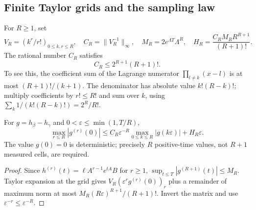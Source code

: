 \subsection{Finite Taylor grids and the sampling law}
For \(R\ge1\), set
\[
 V_R=(k^r/r!)_{0\le k,r\le R},\quad C_R=\|V_R^{-1}\|_\infty,
 \quad M_R=2e^{\Lambda T}\Lambda^R,\quad
 H_R=\frac{C_RM_RR^{R+1}}{(R+1)!}.
\]
The rational number \(C_R\) satisfies
\begin{equation}
 C_R\le2^{R+1}(R+1)!.
 \label{eq:vandermonde-inverse-bound}
\end{equation}
To see this, the coefficient sum of the Lagrange numerator
\(\prod_{l\ne k}(x-l)\) is at most \((R+1)!/(k+1)\).
The denominator has absolute value \(k!(R-k)!\); multiply coefficients by
\(r!\le R!\) and sum over \(k\), using
\(\sum_k1/(k!(R-k)!)=2^R/R!\).

\begin{lemma}
\label{lem:finite-grid-certificate}
For \(g=h_\beta-h_\gamma\) and \(0<\varepsilon\le\min(1,T/R)\),
\begin{equation}
 \max_{r\le R}|g^{(r)}(0)|\le
 C_R\varepsilon^{-R}\max_{0\le k\le R}|g(k\varepsilon)|
 +H_R\varepsilon.
 \label{eq:finite-grid-derivative}
\end{equation}
The value \(g(0)=0\) is deterministic; precisely \(R\) positive-time
values, not \(R+1\) measured cells, are required.
\end{lemma}
\begin{proof}
Since \(h^{(r)}(t)=\ell A^{r-1}e^{tA}B\) for \(r\ge1\),
\(\sup_{t\le T}|g^{(R+1)}(t)|\le M_R\).
Taylor expansion at the grid gives \(V_R(\varepsilon^rg^{(r)}(0))_r\)
plus a remainder of maximum norm at most
\(M_R(R\varepsilon)^{R+1}/(R+1)!\). Invert the matrix and use
\(\varepsilon^{-r}\le\varepsilon^{-R}\).
\end{proof}


